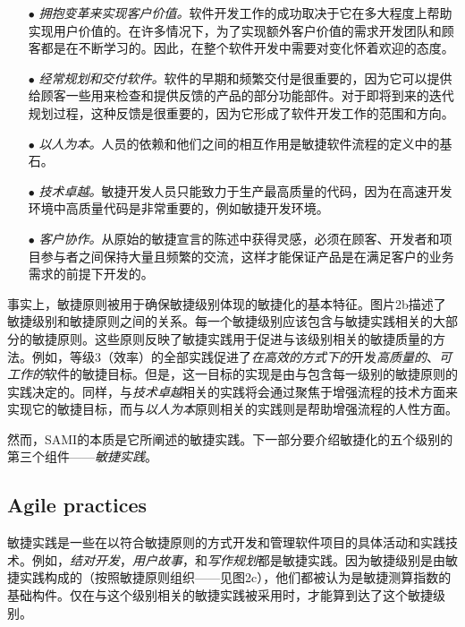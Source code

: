 \documentclass[twocolumn]{svjour3}[]
\begin{document}
\begin{itemize}
    \item[$\bullet$] \textit{拥抱变革来实现客户价值\cite{beck2000extreme}。}软件开发工作的成功取决于它在多大程度上帮助实现用户价值的。在许多情况下，为了实现额外客户价值的需求开发团队和顾客都是在不断学习的。因此，在整个软件开发中需要对变化怀着欢迎的态度。
    \item[$\bullet$] \textit{经常规划和交付软件\cite{beck2001manifesto,Cohn:2005:AEP:1036751,rosenberg2005agile}。}软件的早期和频繁交付是很重要的，因为它可以提供给顾客一些用来检查和提供反馈的产品的部分功能部件。对于即将到来的迭代规划过程，这种反馈是很重要的，因为它形成了软件开发工作的范围和方向。
    \item[$\bullet$] \textit{以人为本\cite{cockburn2001agile}。}人员的依赖和他们之间的相互作用是敏捷软件流程的定义中的基石。
    \item[$\bullet$] \textit{技术卓越\cite{highsmith2002agile,koch2005agile}。}敏捷开发人员只能致力于生产最高质量的代码，因为在高速开发环境中高质量代码是非常重要的，例如敏捷开发环境。
    \item[$\bullet$] \textit{客户协作\cite{beck2001manifesto}。}从原始的敏捷宣言的陈述中获得灵感，必须在顾客、开发者和项目参与者之间保持大量且频繁的交流，这样才能保证产品是在满足客户的业务需求的前提下开发的。
\end{itemize}

事实上，敏捷原则被用于确保敏捷级别体现的敏捷化的基本特征。图片2b描述了敏捷级别和敏捷原则之间的关系。每一个敏捷级别应该包含与敏捷实践相关的大部分的敏捷原则。这些原则反映了敏捷实践用于促进与该级别相关的敏捷质量的方法。例如，等级3（效率）的全部实践促进了\textit{在高效的方式下的}开发\textit{高质量的}、\textit{可工作的}软件的敏捷目标。但是，这一目标的实现是由与包含每一级别的敏捷原则的实践决定的。同样，与\textit{技术卓越}相关的实践将会通过聚焦于增强流程的技术方面来实现它的敏捷目标，而与\textit{以人为本}原则相关的实践则是帮助增强流程的人性方面。

然而，SAMI的本质是它所阐述的敏捷实践。下一部分要介绍敏捷化的五个级别的第三个组件——\textit{敏捷实践}。

\subsection{Agile practices}
\label{apract}

敏捷实践是一些在以符合敏捷原则的方式开发和管理软件项目的具体活动和实践技术。例如，\textit{结对开发}，\textit{用户故事}，和\textit{写作规划}都是敏捷实践。因为敏捷级别是由敏捷实践构成的（按照敏捷原则组织——见图2c），他们都被认为是敏捷测算指数的基础构件。仅在与这个级别相关的敏捷实践被采用时，才能算到达了这个敏捷级别。
\end{document}
